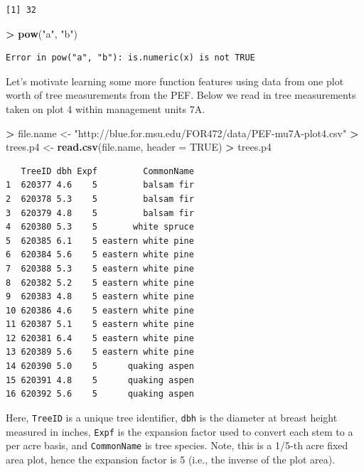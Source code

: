 \documentclass[]{krantz}
\makeatletter
\newenvironment{Shaded}{\begin{snugshade}}{\end{snugshade}}
\newcommand{\DataTypeTok}[1]{\textcolor[rgb]{0.27,0.27,0.27}{#1}}
\newcommand{\KeywordTok}[1]{\textcolor[rgb]{0.27,0.27,0.27}{\textbf{#1}}}
\newcommand{\NormalTok}[1]{#1}
\newcommand{\OperatorTok}[1]{\textcolor[rgb]{0.43,0.43,0.43}{\textbf{#1}}}
\newcommand{\OtherTok}[1]{\textcolor[rgb]{0.37,0.37,0.37}{#1}}
\newcommand{\StringTok}[1]{\textcolor[rgb]{0.5,0.5,0.5}{#1}}
\newenvironment{kframe}{%
\medskip{}
\setlength{\fboxsep}{.8em}
 \def\at@end@of@kframe{}%
 \ifinner\ifhmode%
  \def\at@end@of@kframe{\end{minipage}}%
  \begin{minipage}{\columnwidth}%
 \fi\fi%
 \def\FrameCommand##1{\hskip\@totalleftmargin \hskip-\fboxsep
 \colorbox{shadecolor}{##1}\hskip-\fboxsep
     \hskip-\linewidth \hskip-\@totalleftmargin \hskip\columnwidth}%
 \MakeFramed {\advance\hsize-\width
   \@totalleftmargin\z@ \linewidth\hsize
   \@setminipage}}%
 {\par\unskip\endMakeFramed%
 \at@end@of@kframe}
\renewenvironment{Shaded}{\begin{kframe}}{\end{kframe}}
\makeatother
\begin{document}
\begin{verbatim}
[1] 32
\end{verbatim}

\begin{Shaded}
\begin{Highlighting}[]
\OperatorTok{>}\StringTok{ }\KeywordTok{pow}\NormalTok{(}\StringTok{"a"}\NormalTok{, }\StringTok{"b"}\NormalTok{)}
\end{Highlighting}
\end{Shaded}

\begin{verbatim}
Error in pow("a", "b"): is.numeric(x) is not TRUE
\end{verbatim}

Let's motivate learning some more function features using data from one plot worth of tree measurements from the PEF. Below we read in tree measurements taken on plot 4 within management units 7A.

\begin{Shaded}
\begin{Highlighting}[]
\OperatorTok{>}\StringTok{ }\NormalTok{file.name <-}\StringTok{ "http://blue.for.msu.edu/FOR472/data/PEF-mu7A-plot4.csv"}
\OperatorTok{>}\StringTok{ }\NormalTok{trees.p4 <-}\StringTok{ }\KeywordTok{read.csv}\NormalTok{(file.name, }\DataTypeTok{header =} \OtherTok{TRUE}\NormalTok{)}
\OperatorTok{>}\StringTok{ }\NormalTok{trees.p4}
\end{Highlighting}
\end{Shaded}

\begin{verbatim}
   TreeID dbh Expf         CommonName
1  620377 4.6    5         balsam fir
2  620378 5.3    5         balsam fir
3  620379 4.8    5         balsam fir
4  620380 5.3    5       white spruce
5  620385 6.1    5 eastern white pine
6  620384 5.6    5 eastern white pine
7  620388 5.3    5 eastern white pine
8  620382 5.2    5 eastern white pine
9  620383 4.8    5 eastern white pine
10 620386 4.6    5 eastern white pine
11 620387 5.1    5 eastern white pine
12 620381 6.4    5 eastern white pine
13 620389 5.6    5 eastern white pine
14 620390 5.0    5      quaking aspen
15 620391 4.8    5      quaking aspen
16 620392 5.6    5      quaking aspen
\end{verbatim}

Here, \texttt{TreeID} is a unique tree identifier, \texttt{dbh} is the diameter at breast height measured in inches, \texttt{Expf} is the expansion factor used to convert each stem to a per acre basis, and \texttt{CommonName} is tree species. Note, this is a 1/5-th acre fixed area plot, hence the expansion factor is 5 (i.e., the inverse of the plot area).
\end{document}

